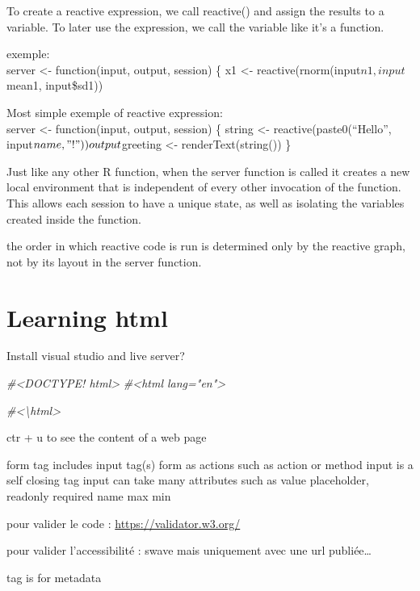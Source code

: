 \documentclass[
]{book}
\newenvironment{Shaded}{\begin{snugshade}}{\end{snugshade}}
\newcommand{\CommentTok}[1]{\textcolor[rgb]{0.56,0.35,0.01}{\textit{#1}}}
\begin{document}
To create a reactive expression, we call reactive() and assign the results to a variable. To later use the expression, we call the variable like it's a function.

exemple:\\
server \textless- function(input, output, session) \{
x1 \textless- reactive(rnorm(input\(n1, input\)mean1, input\$sd1))

Most simple exemple of reactive expression:\\
server \textless- function(input, output, session) \{
string \textless- reactive(paste0(``Hello'', input\(name, "!"))  output\)greeting \textless- renderText(string())
\}

Just like any other R function, when the server function is called it creates a new local environment that is independent of every other invocation of the function. This allows each session to have a unique state, as well as isolating the variables created inside the function.

the order in which reactive code is run is determined only by the reactive graph, not by its layout in the server function.

\hypertarget{learning-html}{%
\chapter{Learning html}\label{learning-html}}

Install visual studio and live server?

\begin{Shaded}
\begin{Highlighting}[]
\CommentTok{\#\textless{}DOCTYPE! html\textgreater{}}
\CommentTok{\#\textless{}html lang="en"\textgreater{}}


\CommentTok{\#\textless{}\textbackslash{}html\textgreater{}}
\end{Highlighting}
\end{Shaded}

ctr + u to see the content of a web page

form tag includes input tag(s)
form as actions such as action or method
input is a self closing tag
input can take many attributes such as value placeholder, readonly required name max min

pour valider le code :
\url{https://validator.w3.org/}

pour valider l'accessibilité :
swave mais uniquement avec une url publiée\ldots{}

tag is for metadata
\end{document}
